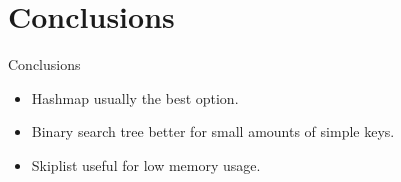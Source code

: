 \documentclass[10pt]{beamer}
\begin{document}
\section{Conclusions}

\begin{frame}{Conclusions}
    \begin{itemize}
        \item Hashmap usually the best option.
        \item Binary search tree better for small amounts of simple keys.
        \item Skiplist useful for low memory usage.
    \end{itemize}
\end{frame}
\end{document}
